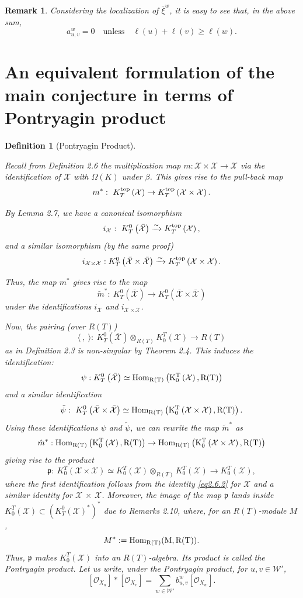 \documentclass{article}
\newtheorem{definition}[theorem]{Definition}
\newtheorem{remark}[theorem]{Remark}
\def\X{\mathcal{X}}
\def\W{\mathcal{W}}
\def\p{\mathfrak{p}}
\def\ref#1{#1}
\def\top{\rm{top}}
\def\Hom{\rm{Hom}}
\begin{document}
\begin{remark}\label{2.10}\rm{
Considering the localization of $\bar{\xi}^w$, it is easy to see that, in the above sum, }
$$ 
a^w_{u,v} =0 \quad \mbox{unless} \quad \ell(u)+\ell(v) \geq \ell(w).
$$ 
\end{remark}
\section{An equivalent formulation of the main conjecture in terms of Pontryagin product}

\begin{definition}[Pontryagin Product]\label{3.1}\rm{
 Recall from Definition \ref{2.6} the multiplication map 
$m: \X\times \X \rightarrow \X$ via the identification of $\X$ with $\Omega(K)$ under $\beta$. This gives rise to the pull-back map
$$
m^*:~ K_T^{\top}\left(\X\right) \rightarrow K_T^{\top} \left(\X\times \X\right).
$$

By Lemma \ref{2.7}, we have a canonical isomorphism 
$$
i_{\X}: ~K^0_T\left(\bar{\X}\right) \xrightarrow{\sim} K_T^{\top}\left(\X\right),
$$
and a similar isomorphism (by the same proof)
$$
i_{\X\times \X} : K^0_T\left(\bar{\X}\times\bar{\X}\right)\xrightarrow{\sim} K_T^{\top}\left(\X\times \X\right).
$$

Thus, the map $m^*$ gives rise to the map
$$
\tilde{m}^*:~ K^0_T\left(\bar{\X}\right) \rightarrow K^0_T\left(\bar{\X}\times\bar{\X}\right)
$$
under the identifications $i_{\X}$ and $i_{\X\times \X}$. 

Now, the pairing (over $R(T)$)
$$
\langle ~,~\rangle: ~ K^0_T\left(\bar{\X}\right) \otimes_{R(T)}  K_0^T\left({\X}\right) \rightarrow R(T)
$$
as in Definition \ref{2.3} is non-singular by Theorem \ref{2.4}. This induces the identification: 
$$
\psi :  K^0_T\left(\bar{\X}\right) \simeq \Hom_{R(T)} \left(K_0^T\left({\X}\right) ,R(T)\right)
$$
and a similar identification
$$
\tilde{\psi}:~K^0_T\left(\bar{\X}\times\bar{\X}\right)\simeq \Hom_{R(T)} \left(K_0^{T}\left(\X\times \X\right) ,R(T)\right).
$$
Using these identifications $\psi$ and $\tilde{\psi}$, we can rewrite the map $\tilde{m}^*$ as 
$$
\hat{m}^*:\Hom_{R(T)} \left(K_0^T\left({\X}\right) ,R(T)\right) \rightarrow \Hom_{R(T)} \left(K_0^{T}\left(\X\times \X\right) ,R(T)\right)
$$
giving rise to the product 
$$
{\p}:~K_0^{T}\left(\X\times \X\right) \simeq K^T_0\left({\X}\right) \otimes_{R(T)} K_0^T\left({\X}\right) \rightarrow K_0^T\left({\X}\right),
$$
where the first identification follows from the identity \eqref{eq2.6.2} for $\X$ and a similar identity for $\X$ $\times$ $\X$. Moreover, the image of the map $\p$ lands inside 
$K_0^T\left({\X}\right) \subset \left(K^0_T\left({\X}\right)^*\right)^*$ due to Remarks \ref{2.10}, where, for an $R(T)$-module $M$, 
$$
M^* := \Hom_{R(T)} (M,R(T)).
$$
Thus, $\p$ makes $K_0^T\left({\X}\right)$ into an $R(T)$-algebra. Its product is called the {\it Pontryagin product}. Let us write,  under the Pontryagin product, 
for $u,v \in \W'$,
\begin{equation}\label{3.1.1}
\left[\mathcal{O}_{X_u}\right]* \left[\mathcal{O}_{X_v}\right]= \sum_{ w\in \W'}b_{u,v}^w\left [\mathcal{O}_{X_w}\right]. 
\end{equation}

}
\end{definition}
\end{document}

